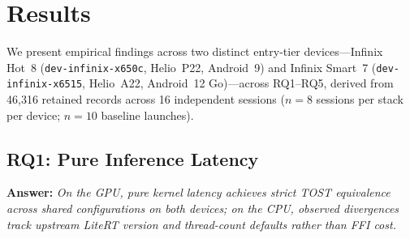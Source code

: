 \section{Results}\label{sec:results}

We present empirical findings across two distinct entry-tier devices---Infinix Hot~8 (\texttt{dev-infinix-x650c}, Helio~P22, Android~9) and Infinix Smart~7 (\texttt{dev-infinix-x6515}, Helio~A22, Android~12 Go)---across RQ1--RQ5, derived from 46,316 retained records across 16 independent sessions ($n=8$ sessions per stack per device; $n=10$ baseline launches).

\subsection{RQ1: Pure Inference Latency}\label{subsec:rq1}
\textbf{Answer:} \textit{On the GPU, pure kernel latency achieves strict TOST equivalence across shared configurations on both devices; on the CPU, observed divergences track upstream LiteRT version and thread-count defaults rather than FFI cost.}

